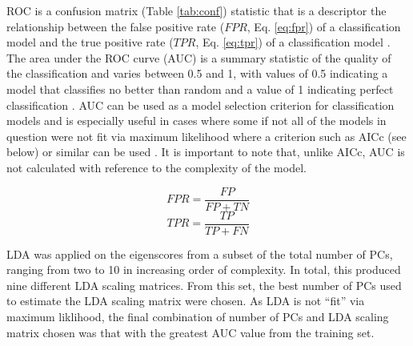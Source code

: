 \documentclass[12pt,letterpaper]{article}\usepackage{graphicx, color}
\begin{document}

ROC is a confusion matrix (Table \ref{tab:conf}) statistic that is a descriptor the relationship between the false positive rate (\(FPR\), Eq. \ref{eq:fpr}) of a classification model and the true positive rate (\(TPR\), Eq. \ref{eq:tpr}) of a classification model \citep{Hastie2009}. 
The area under the ROC curve (AUC) is a summary statistic of the quality of the classification and varies between 0.5 and 1, with values of 0.5 indicating a model that classifies no better than random and a value of 1 indicating perfect classification \citep{Hastie2009}. AUC can be used as a model selection criterion for classification models and is especially useful in cases where some if not all of the models in question were not fit via maximum likelihood where a criterion such as AICc (see below) or similar can be used \citep{Hastie2009}. It is important to note that, unlike AICc, AUC is not calculated with reference to the complexity of the model.

\begin{equation}
  FPR = \frac{FP}{FP + TN}
  \label{eq:fpr}
\end{equation}
\begin{equation}
  TPR = \frac{TP}{TP + FN}
  \label{eq:tpr}
\end{equation}

LDA was applied on the eigenscores from a subset of the total number of PCs, ranging from two to 10 in increasing order of complexity. In total, this produced nine different LDA scaling matrices. From this set, the best number of PCs used to estimate the LDA scaling matrix were chosen. As LDA is not ``fit'' via maximum liklihood, the final combination of number of PCs and LDA scaling matrix chosen was that with the greatest AUC value from the training set.
\end{document}
